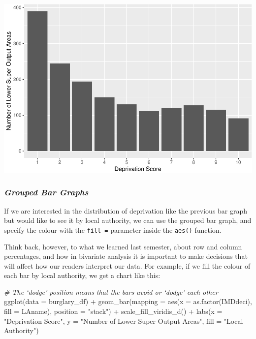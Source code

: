 \documentclass[
]{book}
\newenvironment{Shaded}{\begin{snugshade}}{\end{snugshade}}
\newcommand{\AttributeTok}[1]{\textcolor[rgb]{0.77,0.63,0.00}{#1}}
\newcommand{\CommentTok}[1]{\textcolor[rgb]{0.56,0.35,0.01}{\textit{#1}}}
\newcommand{\FunctionTok}[1]{\textcolor[rgb]{0.00,0.00,0.00}{#1}}
\newcommand{\NormalTok}[1]{#1}
\newcommand{\SpecialCharTok}[1]{\textcolor[rgb]{0.00,0.00,0.00}{#1}}
\newcommand{\StringTok}[1]{\textcolor[rgb]{0.31,0.60,0.02}{#1}}
\begin{document}
\includegraphics{03-data-visualisation_files/figure-latex/unnamed-chunk-13-1.pdf}

\hypertarget{grouped-bar-graphs}{%
\subsubsection{\texorpdfstring{\emph{Grouped Bar Graphs}}{Grouped Bar Graphs}}\label{grouped-bar-graphs}}

If we are interested in the distribution of deprivation like the previous bar graph but would like to see it by local authority, we can use the grouped bar graph, and specify the colour with the \texttt{fill\ =} parameter inside the \texttt{aes()} function.

Think back, however, to what we learned last semester, about row and column percentages, and how in bivariate analysis it is important to make decisions that will affect how our readers interpret our data. For example, if we fill the colour of each bar by local authority, we get a chart like this:

\begin{Shaded}
\begin{Highlighting}[]
\CommentTok{\# The ‘dodge’ position means that the bars avoid or ‘dodge’ each other}
\FunctionTok{ggplot}\NormalTok{(}\AttributeTok{data =}\NormalTok{ burglary\_df) }\SpecialCharTok{+} 
  \FunctionTok{geom\_bar}\NormalTok{(}\AttributeTok{mapping =} \FunctionTok{aes}\NormalTok{(}\AttributeTok{x =} \FunctionTok{as.factor}\NormalTok{(IMDdeci), }\AttributeTok{fill =}\NormalTok{ LAname), }\AttributeTok{position =} \StringTok{"stack"}\NormalTok{) }\SpecialCharTok{+}
  \FunctionTok{scale\_fill\_viridis\_d}\NormalTok{() }\SpecialCharTok{+} 
  \FunctionTok{labs}\NormalTok{(}\AttributeTok{x =} \StringTok{"Deprivation Score"}\NormalTok{, }\AttributeTok{y =} \StringTok{"Number of Lower Super Output Areas"}\NormalTok{, }\AttributeTok{fill =} \StringTok{"Local Authority"}\NormalTok{)}
\end{Highlighting}
\end{Shaded}
\end{document}
